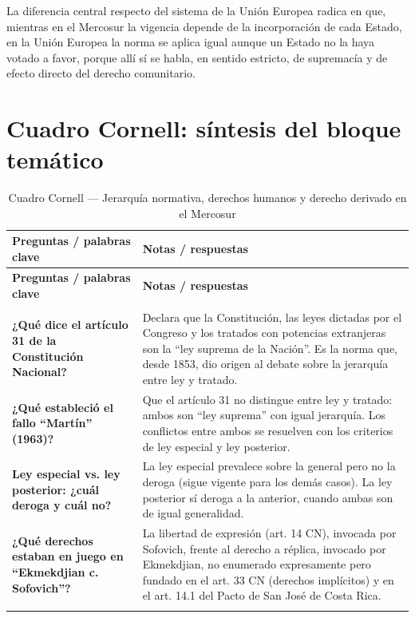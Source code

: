 \documentclass[12pt,oneside]{book}
\begin{document}
La diferencia central respecto del sistema de la Unión Europea radica en que, mientras en el Mercosur la vigencia depende de la incorporación de cada Estado, en la Unión Europea la norma se aplica igual aunque un Estado no la haya votado a favor, porque allí sí se habla, en sentido estricto, de supremacía y de efecto directo del derecho comunitario.

\section{Cuadro Cornell: síntesis del bloque temático}

\begin{longtable}{@{}>{\raggedright\arraybackslash}p{}>{\raggedright\arraybackslash}p{}@{}}
\caption{Cuadro Cornell --- Jerarquía normativa, derechos humanos y derecho derivado en el Mercosur} \\
\toprule
\textbf{Preguntas / palabras clave} & \textbf{Notas / respuestas} \\
\midrule
\endfirsthead
\toprule
\textbf{Preguntas / palabras clave} & \textbf{Notas / respuestas} \\
\midrule
\endhead
\midrule
\multicolumn{2}{r}{\textit{Continúa en la página siguiente}} \\
\endfoot
\bottomrule
\endlastfoot

\textbf{¿Qué dice el artículo 31 de la Constitución Nacional?} &
Declara que la Constitución, las leyes dictadas por el Congreso y los tratados con potencias extranjeras son la ``ley suprema de la Nación''. Es la norma que, desde 1853, dio origen al debate sobre la jerarquía entre ley y tratado. \\
\addlinespace

\textbf{¿Qué estableció el fallo ``Martín'' (1963)?} &
Que el artículo 31 no distingue entre ley y tratado: ambos son ``ley suprema'' con igual jerarquía. Los conflictos entre ambos se resuelven con los criterios de ley especial y ley posterior. \\
\addlinespace

\textbf{Ley especial vs. ley posterior: ¿cuál deroga y cuál no?} &
La ley especial prevalece sobre la general pero no la deroga (sigue vigente para los demás casos). La ley posterior sí deroga a la anterior, cuando ambas son de igual generalidad. \\
\addlinespace

\textbf{¿Qué derechos estaban en juego en ``Ekmekdjian c. Sofovich''?} &
La libertad de expresión (art. 14 CN), invocada por Sofovich, frente al derecho a réplica, invocado por Ekmekdjian, no enumerado expresamente pero fundado en el art. 33 CN (derechos implícitos) y en el art. 14.1 del Pacto de San José de Costa Rica. \\
\addlinespace


\end{longtable}
\end{document}
